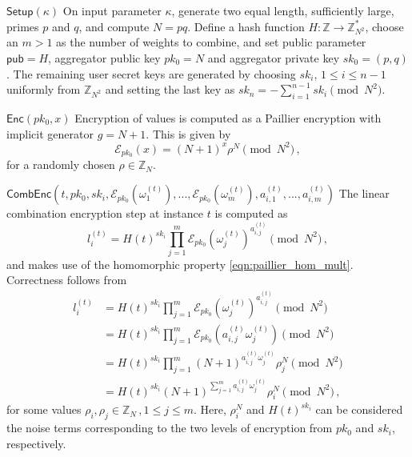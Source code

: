 \documentclass[10pt,letterpaper,oneside,twocolumn,journal]{IEEEtran}
\theoremstyle{definition}
\theoremstyle{definition}
\theoremstyle{remark}
\newcommand\shrtdots{\!...}
\begin{document}
\begin{LaTeXdescription}
    \item[$\mathsf{Setup}(\kappa)$] On input parameter $\kappa$, generate two equal length, sufficiently large, primes $p$ and $q$, and compute $N=pq$. Define a hash function $H:\mathbb{Z} \rightarrow \mathbb{Z}_{N^2}^*$, choose an $m>1$ as the number of weights to combine, and set public parameter $\mathsf{pub}=H$, aggregator public key $pk_0 = N$ and aggregator private key $sk_0=(p,q)$. The remaining user secret keys are generated by choosing $sk_i,\,1\leq i\leq n-1$ uniformly from $\mathbb{Z}_{N^2}$ and setting the last key as $sk_n = -\sum^{n-1}_{i=1}sk_i \pmod{N^2}$.
 
    \item[$\mathsf{Enc}(pk_0, x)$] Encryption of values is computed as a Paillier encryption with implicit generator $g=N+1$. This is given by
    \begin{equation}
        \mathcal{E}_{pk_0}(x) = (N+1)^{x}\rho^N \pmod{N^2}\,, \label{eqn:our_scheme_encrypt}
    \end{equation}
    for a randomly chosen $\rho \in \mathbb{Z}_N$.

    \item[$\mathsf{CombEnc}(t, pk_0, sk_i, \mathcal{E}_{pk_0}(\omega_1^{(t)}),\shrtdots,\mathcal{E}_{pk_0}(\omega_m^{(t)}), a^{(t)}_{i,1},\shrtdots,a^{(t)}_{i,m})$] The linear combination encryption step at instance $t$ is computed as 
    \begin{equation}
        l^{(t)}_i = H(t)^{sk_i}\prod^{m}_{j=1}\mathcal{E}_{pk_0}(\omega^{(t)}_j)^{a^{(t)}_{i,j}} \pmod{N^2}\,,\label{eqn:our_scheme_lin_comb}
    \end{equation}
    and makes use of the homomorphic property \eqref{eqn:paillier_hom_mult}. Correctness follows from
    \begin{equation*}
        \begin{split}
             l^{(t)}_i &= H(t)^{sk_i}\prod^{m}_{j=1}\mathcal{E}_{pk_0}(\omega^{(t)}_j)^{a^{(t)}_{i,j}} \pmod{N^2} \\
            &= H(t)^{sk_i}\prod^{m}_{j=1}\mathcal{E}_{pk_0}(a^{(t)}_{i,j}\omega^{(t)}_j) \pmod{N^2} \\
            &= H(t)^{sk_i}\prod^{m}_{j=1}(N+1)^{a^{(t)}_{i,j}\omega^{(t)}_j} \rho^{N}_{j} \pmod{N^2} \\
            &= H(t)^{sk_i}(N+1)^{\sum^{m}_{j=1}a^{(t)}_{i,j}\omega^{(t)}_j} \rho_{i}^{N} \pmod{N^2}\,,
        \end{split}
    \end{equation*}
    for some values $\rho_i,\rho_j \in \mathbb{Z}_N\,,1\leq j \leq m$. Here, $\rho_i^N$ and $H(t)^{sk_i}$ can be considered the noise terms corresponding to the two levels of encryption from $pk_0$ and $sk_i$, respectively.


\end{LaTeXdescription}
\end{document}
